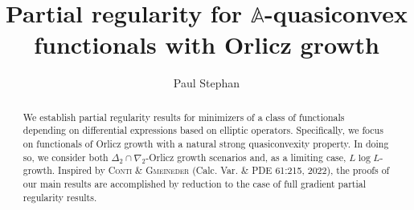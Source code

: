 \documentclass[a4paper,11pt]{amsart}
\title[$\mathbb{A}$-quasiconvexity, partial regularity and Orlicz growth]{Partial regularity for $\mathbb{A}$-quasiconvex \\  functionals with Orlicz growth}
\numberwithin{equation}{section}
\begin{document}
	
	\author{Paul Stephan}
	\address{P.S.: Department of Mathematics and Statistics, University of Konstanz, Universit\"{a}tsstra\ss e 10, 78464 Konstanz, Germany}
	
	\maketitle
	
	
	\begin{abstract}
		We establish partial regularity results for minimizers of a class of functionals depending on differential expressions based on elliptic operators. Specifically, we focus on functionals of Orlicz growth with a natural strong quasiconvexity property. In doing so, we consider both $\Delta_{2}\cap\nabla_{2}$-Orlicz growth scenarios and, as a limiting case, $L \log L$-growth. Inspired by {\textsc{Conti \&
				Gmeineder} (Calc. Var. \& PDE 61:215, 2022)}, the proofs of our main results are accomplished by reduction to the case of full gradient partial regularity results.
	\end{abstract}
	
	\tableofcontents
	
\end{document}
